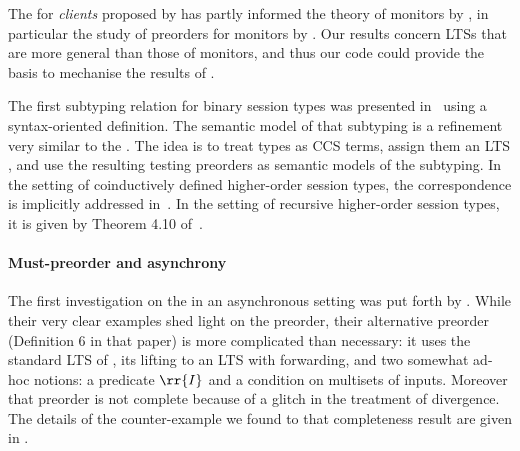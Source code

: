 The \mustpreorder for {\em clients} proposed by
\cite{DBLP:journals/corr/BernardiH15} has partly informed the
theory of monitors by \cite{DBLP:journals/pacmpl/AcetoAFIL19},
in particular the study of preorders for monitors by
\cite{DBLP:journals/iandc/Francalanza21}.
Our results concern LTSs that are more general than those of monitors,
and thus %
our code could provide the basis to mechanise
the results of \cite{DBLP:journals/pacmpl/AcetoAFIL19}.

The first subtyping relation for binary session types was presented
in~\cite{DBLP:journals/acta/GayH05} using a syntax-oriented definition.
The semantic model of that subtyping is a refinement %
very similar to the \mustpreorder. The idea is to treat types as \textsc{CCS} terms,
assign them an LTS
\cite{DBLP:conf/ppdp/CastagnaDGP09,DBLP:conf/ppdp/Barbanerad10,DBLP:journals/iandc/RavaraRV12,DBLP:journals/mscs/BernardiH16},
and use the resulting testing preorders as semantic models of the
subtyping.
In the setting of coinductively defined higher-order session types, the
correspondence is implicitly addressed
in~\cite{DBLP:conf/ppdp/CastagnaDGP09}.
In the setting of recursive higher-order session types, %
it is given by Theorem 4.10 of~\cite{DBLP:journals/corr/BernardiH13}.

%
%


\paragraph{Must-preorder and asynchrony}
The first investigation on the \mustpreorder in an asynchronous
setting was put forth by \cite{DBLP:conf/fsttcs/CastellaniH98}.
While their very clear examples shed light on the preorder, their
alternative preorder (Definition 6 in that paper) is more complicated
than necessary: it uses the standard LTS of \TACCS, its lifting to an LTS
with forwarding, and two somewhat ad-hoc notions: a predicate $\rr{I}$ and a condition on multisets of inputs. %
Moreover that preorder is not complete because of a glitch in the treatment of divergence. The details of the counter-example we found to that completeness
result are given in .

